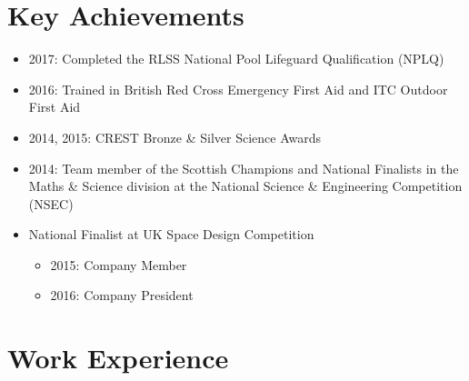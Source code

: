 \documentclass[10pt, a4paper]{article}
\begin{document}
\section{Key Achievements}
\begin{itemize}
	\item 2017: Completed the RLSS National Pool Lifeguard Qualification (NPLQ)
	\item 2016: Trained in British Red Cross Emergency First Aid and ITC Outdoor First Aid
	\item 2014, 2015: CREST Bronze \& Silver Science Awards
	\item 2014: Team member of the Scottish Champions and National Finalists in the Maths \& Science division at the National Science \& Engineering Competition (NSEC)
	\item National Finalist at UK Space Design Competition
	\begin{itemize}
		\item 2015: Company Member
		\item 2016: Company President
	\end{itemize}
\end{itemize}

\section{Work Experience}
\end{document}
